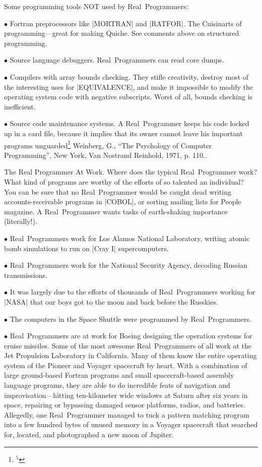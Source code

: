 Some programming tools NOT used by Real~Programmers:
\startlist
\item{$\bullet$} Fortran preprocessors like |MORTRAN| and |RATFOR|. The
Cuisinarts of programming---great for making Quiche. See comments
above on structured programming.
\item{$\bullet$} Source language debuggers. Real~Programmers can read core dumps.
\item{$\bullet$} Compilers with array bounds checking. They stifle creativity,
destroy most of the interesting uses for |EQUIVALENCE|, and make it impossible
to modify the operating system code with negative subscripts. Worst of
all, bounds checking is inefficient.
\item{$\bullet$} Source code maintenance
systems. A Real~Programmer keeps his code locked up in a card file,
because it implies that its owner cannot leave his important programs
unguarded\footnote{$^5$}{%
Weinberg, G., ``The Psychology of Computer Programming'', New York, Van Nostrand Reinhold, 1971, p. 110.}.
\endlist

\sect The Real Programmer At Work.
Where does the typical Real~Programmer work? What kind
of programs are worthy of the efforts of so talented an individual?
You can be sure that no Real~Programmer would be caught dead writing
accounts-receivable programs in |COBOL|, or sorting mailing lists for
People magazine. A Real~Programmer wants tasks of earth-shaking
importance (literally!).
\startlist
\item{$\bullet$} Real~Programmers work for Los Alamos National Laboratory, writing atomic bomb simulations to run on |Cray I| supercomputers.
\item{$\bullet$} Real~Programmers work for the National Security Agency, decoding Russian transmissions.
\item{$\bullet$} It was largely due to the efforts of thousands of Real~Programmers working for |NASA| that our boys got to the moon and back before the Russkies.
\item{$\bullet$} The computers in the Space Shuttle were programmed by Real~Programmers.
\item{$\bullet$} Real~Programmers are at work for Boeing designing the operation systems for cruise missiles.
\endlist
Some of the most awesome Real~Programmers of all work at the Jet
Propulsion Laboratory in California. Many of them know the entire
operating system of the Pioneer and Voyager spacecraft by heart. With
a combination of large ground-based Fortran programs and small
spacecraft-based assembly language programs, they are able to do
incredible feats of navigation and improvisation---hitting
ten-kilometer wide windows at Saturn after six years in space,
repairing or bypassing damaged sensor platforms, radios, and
batteries. Allegedly, one Real~Programmer managed to tuck a pattern
matching program into a few hundred bytes of unused memory in a
Voyager spacecraft that searched for, located, and photographed a new
moon of Jupiter.

